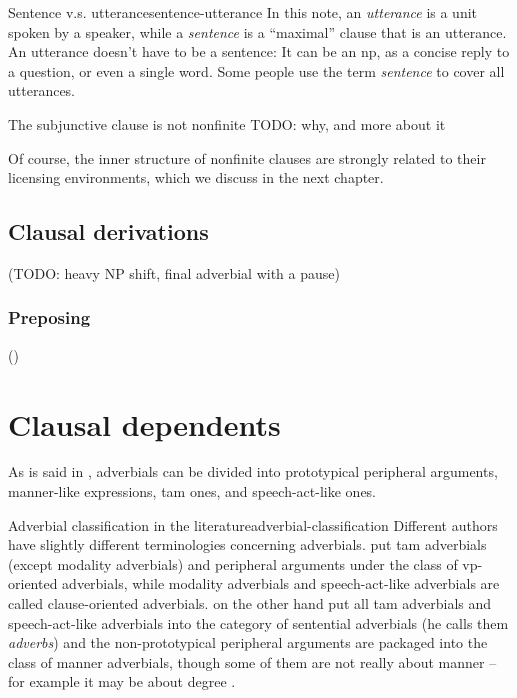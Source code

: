 \documentclass[UTF8, a4paper, oneside, scheme=plain]{ctexrep}
\newcommand*{\citepage}[1]{p.~{#1}}
\newcommand*{\term}[1]{\emph{#1}}
\begin{document}
\begin{infobox}{Sentence v.s. utterance}{sentence-utterance}
    In this note, an \term{utterance} is a unit spoken by a speaker,
    while a \term{sentence} is a ``maximal'' clause that is an utterance.
    An utterance doesn't have to be a sentence:
    It can be an \acs{np}, as a concise reply to a question,
    or even a single word.
    Some people use the term \term{sentence} to cover all utterances.
\end{infobox}

The subjunctive clause is not nonfinite \citep[\citepage{83}]{cgel} TODO: why, and more about it 

Of course, the inner structure of nonfinite clauses are strongly related to their licensing environments,
which we discuss in the next chapter.

\subsection{Clausal derivations}\label{sec:simple-clause.derivation}

(TODO: heavy NP shift, final adverbial with a pause)

\subsubsection{Preposing}\label{sec:simple-clause.derivation.preposing}

()

\section{Clausal dependents}\label{sec:simple-clause.dependents}

As is said in ,
adverbials can be divided into 
prototypical peripheral arguments,
manner-like expressions, 
\acs{tam} ones, and speech-act-like ones.

\begin{infobox}{Adverbial classification in the literature}{adverbial-classification}
    Different authors have slightly different terminologies concerning adverbials.
    \citet[\citepage{576}]{cgel} put \acs{tam} adverbials (except modality adverbials) 
    and peripheral arguments
    under the class of \acs{vp}-oriented adverbials, 
    while modality adverbials and speech-act-like adverbials are called clause-oriented adverbials.
    \citet[\citepage{386}]{dixon2005semantic} on the other hand 
    put all \acs{tam} adverbials and speech-act-like adverbials 
    into the category of sentential adverbials (he calls them \term{adverbs})
    and the non-prototypical peripheral arguments are packaged into the class of manner adverbials,
    though some of them are not really about manner -- 
    for example it may be about degree \citet[\citepage{576}]{cgel}.
\end{infobox}
\end{document}
